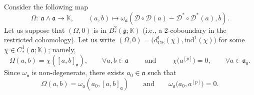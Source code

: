 \documentclass[10pt,a4paper]{amsart}
\numberwithin{equation}{section}
\begin{document}
Consider the following map
\[
\Omega\colon \ \mathfrak{a}\wedge \mathfrak{a} \rightarrow \mathbb{K},\qquad (a,b) \mapsto \omega_\mathfrak{a}( {\mathscr D} \circ {\mathscr D}(a) - {\mathscr D}^* \circ {\mathscr D}^*(a) , b).
\]
Let us suppose that $(\Omega, 0)$ is in $B^2_*(\mathfrak{g};\mathbb{K})$ (i.e., a 2-coboundary in the restricted cohomology). Let us write $(\Omega,0)= \bigl(d^1_{\mathrm{CE}} (\chi), \mathrm{ind}^1(\chi) \bigr)$ for some $\chi\in C^1_*(\mathfrak{a}; \mathbb{K})$; namely,
\[
\Omega(a,b)=\chi([a,b]_\mathfrak{a}),\qquad \forall a,b\in \mathfrak{a} \qquad \text{ and } \qquad \chi\bigl(a^{[p]}\bigr)=0,\qquad \forall a\in \mathfrak{a}_{\bar 0}.
\]
Since $\omega_\mathfrak{a}$ is non-degenerate, there exists $a_0\in \mathfrak{a}$ such that
\begin{equation}
\label{azero}
\Omega(a,b)=\omega_\mathfrak{a}(a_0,[a,b]_\mathfrak{a})\qquad \text{and} \qquad \omega_\mathfrak{a}\bigl(a_0,a^{[p]}\bigr)=0.
\end{equation}
\end{document}
